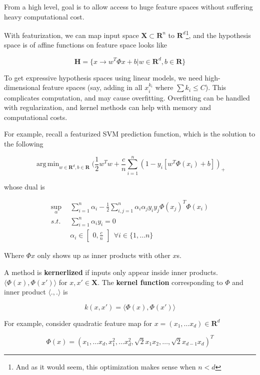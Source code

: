 \documentclass{article}
\DeclareMathOperator*{\argmin}{arg\,min}
\DeclareMathOperator*{\msup}{sup}
\begin{document}
From a high level, goal is to allow access to huge feature spaces without suffering heavy computational cost.

With featurization, we can map input space $\mathbf{X} \subset \mathbf{R}^n$ to $\mathbf{R}^d$\footnote{And as it would seem, this optimization makes sense when $n < d$}, and the hypothesis space is of affine functions on feature space looks like

$$
\mathbf{H} = \{ x \to w^{T}\Phi{x} + b | w \in \mathbf{R}^d, b \in \mathbf{R} \}
$$

To get expressive hypothesis spaces using linear models, we need high-dimensional feature spaces (say, adding in all $x_i^{k_i}$ where $\sum{k_i} \leq C$).
This complicates computation, and may cause overfitting.
Overfitting can be handled with regularization, and kernel methods can help with memory and computational costs.

For example, recall a featurized SVM prediction function, which is the solution to the following

$$
\argmin_{w \in \mathbf{R}^d, b \in \mathbf{R}} (\frac{1}{2} w^{T} w + \frac{c}{n} \sum_{i = 1}^{n}{(1 - y_i [w^T \Phi(x_i) + b])_+}
$$

whose dual is

\begin{align*}
\msup_{\alpha} ~ ~ & \sum_{i = 1}^{n}{\alpha_i} - \frac{1}{2} \sum_{i,j = 1}^{n}{\alpha_i \alpha_j y_i y_j \Phi(x_j)^{T} \Phi(x_i)} \\
s.t.               & \sum_{i = 1}^{n}{\alpha_i y_i} = 0 \\
                   & \alpha_i \in \begin{bmatrix}0, \frac{c}{n}\end{bmatrix} ~ ~ \forall i \in \{1, \dots n\}
\end{align*}

Where $\Phi{x}$ only shows up as inner products with other $x$s.

A method is \textbf{kernerlized} if inputs only appear inside inner products. $\langle \Phi(x) , \Phi(x') \rangle$ for $x, x' \in \mathbf{X}$.
The \textbf{kernel function} corresponding to $\Phi$ and inner product $\langle . , . \rangle$ is

$$
k(x, x') = \langle \Phi(x) , \Phi(x') \rangle
$$

For example, consider quadratic feature map for $x = (x_1, \dots x_d) \in \mathbf{R}^d$

$$
\Phi(x) = (x_1, \dots x_d, x_1^2, \dots x_d^2, \sqrt{2} x_1 x_2, \dots, \sqrt{2} x_{d - 1} x_d)^T
$$
\end{document}
